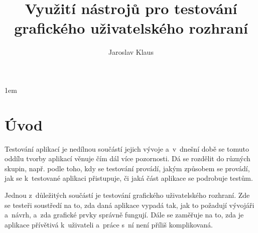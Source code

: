 \documentclass{bakalarka}
\author{Jaroslav Klaus}
\title{Využití nástrojů pro testování grafického uživatelského rozhraní}
\begin{document}
\pagestyle{fancy}
\renewcommand{\chaptermark}[1]{\markboth{\textit{#1}}{}}
\renewcommand{\sectionmark}[1]{\markright{\textit{#1}}{}}
\cfoot{\thepage}
\lhead{\leftmark}
\rhead{\rightmark}
\maketitle

\tableofcontents
\pagestyle{fancy}
\renewcommand{\chaptermark}[1]{\markboth{\textit{#1}}{}}
\renewcommand{\sectionmark}[1]{\markright{\textit{#1}}{}}
\cfoot{\thepage}
\lhead{\leftmark}
\rhead{\rightmark}
\parskip 1em
\chapter{Úvod}
Testování aplikací je nedílnou součástí jejich vývoje a~v~dnešní době se tomuto oddílu tvorby aplikací věnuje čím dál více pozornosti. Dá se rozdělit do různých skupin, např. podle toho, kdy se testování provádí, jakým způsobem se provádí, jak se k~testované aplikaci přistupuje, či jaká část aplikace se podrobuje testům.

Jednou z~důležitých součástí je testování grafického uživatelského rozhraní. Zde se testeři soustředí na to, zda daná aplikace vypadá tak, jak to požadují vývojáři a~návrh, a~zda grafické prvky správně fungují. Dále se zaměřuje na to, zda je aplikace přívětivá k~uživateli a~práce s~ní není příliš komplikovaná.
\end{document}

